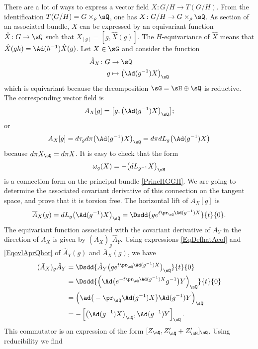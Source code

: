 There are a lot of ways to express a vector field $X\colon G/H\to T(G/H)$. From the identification $T(G/H)=G\times_{\rho}\sQ$, one has $X\colon G/H\to G\times_{\rho}\sQ$. As section of an associated bundle, $X$ can be expressed by an equivariant function $\hat{X}\colon G\to \sQ$ such that $X_{[g]}=[g,\hat{X}(g)]$. The $H$-equivariance of $\hat X$ means that $\hat{X}(gh)=\Ad(h^{-1})\hat{X}(g)$.  Let $X\in\sG$ and consider the function
\begin{equation}        \label{EqDefhatAcol}
\begin{aligned}
 \hat A_X\colon G&\to \sQ \\
g&\mapsto \big( \Ad(g^{-1})X \big)_{\sQ}
\end{aligned}
\end{equation}
which is equivariant because the decomposition $\sG=\sH\oplus\sQ$ is reductive. The corresponding vector field is
\[
  A_X[g]=\big[ g,\big( \Ad(g^{-1})X \big)_{\sQ} \big];
\]
or
\[
  A_X[g]=d\tau_gd\pi\big( \Ad(g^{-1})X \big)_{\sQ}=d\pi dL_g\big( \Ad(g^{-1})X \big)
\]
because $d\pi X_{\sQ}=d\pi X$. It is easy to check that the form
\[
  \omega_g(X)=-\big( dL_{g^{-1}}X \big)_{\sH}
\]
is a connection form on the principal bundle \eqref{PrincHGGH}.  We are going to determine the associated covariant derivative of this connection on the tangent space, and prove that it is torsion free. The horizontal lift of $A_X[g]$ is
\begin{equation}    \label{EqovlAprQhor}
  \overline{ A }_X(g)=dL_g\big( \Ad(g^{-1})X \big)_{\sQ}=\Dsdd{ g e^{t\pr_{\sQ}\Ad(g^{-1})X} }{t}{0}.
\end{equation}
The equivariant function associated with the covariant derivative of $A_Y$ in the direction of $A_X$ is given by $(\overline{ A }_X)_g\hat A_Y$. Using expressions  \eqref{EqDefhatAcol} and  \eqref{EqovlAprQhor} of $\hat A_Y(g)$ and $\overline{ A }_X(g)$, we have
\[
\begin{split}
  (\bar A_X)_g\hat A_Y  &=\Dsdd{ \hat A_Y\big( g e^{t\pr_{\sQ}\Ad(g^{-1})X} \big)_{\sQ} }{t}{0}\\
            &=\Dsdd{ \left( \Ad\big(  e^{-t\pr_{\sQ}\Ad(g^{-1})X}g^{-1}  \big)Y \right)_{\sQ} }{t}{0}\\
            &=\Big( \ad\big( -\pr_{\sQ}\Ad(g^{-1})X \big)\Ad(g^{-1})Y \Big)_{\sQ}\\
            &=-\left[ \big( \Ad(g^{-1})X \big)_{\sQ},\Ad(g^{-1})Y  \right]_{\sQ}.
\end{split}
\]
This commutator is an expression of the form $[Z_{\sQ},Z'_{\sQ}+Z'_{\sH}]_{\sQ}$. Using reducibility we find
